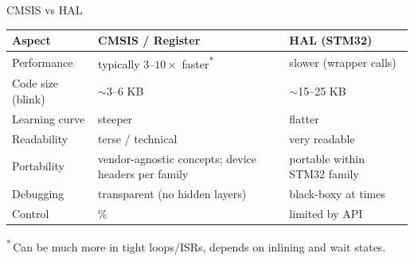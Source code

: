 \documentclass{beamer}
\begin{document}
\begin{frame}{CMSIS vs HAL}
	\small
	\begin{tabularx}{\linewidth}{@{} l >{\raggedright\arraybackslash}X >{\raggedright\arraybackslash}X @{}}
		\toprule
		\textbf{Aspect} & \textbf{CMSIS / Register} & \textbf{HAL (STM32)} \\
		\midrule
		Performance & typically $3$--$10\times$ faster\textsuperscript{*} & slower (wrapper calls) \\
		Code size (blink) & $\sim$3--6 KB & $\sim$15--25 KB \\
		Learning curve & steeper & flatter \\
		Readability & terse / technical & very readable \\
		Portability & vendor-agnostic concepts; device headers per family & portable within STM32 family \\
		Debugging & transparent (no hidden layers) & black-boxy at times \\
		Control & 100\% & limited by API \\
		\bottomrule
	\end{tabularx}
	
	\medskip
	{\footnotesize\textsuperscript{*}\,Can be much more in tight loops/ISRs, depends on inlining and wait states.}
\end{frame}
\end{document}
